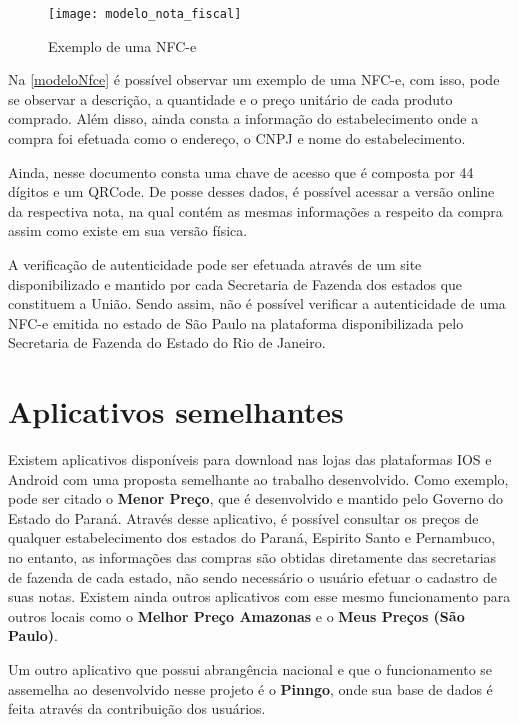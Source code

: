 \begin{figure}[h]
    \centering
    \texttt{[image: modelo\_nota\_fiscal]}
    \caption{Exemplo de uma NFC-e}
    \label{modeloNfce}
\end{figure}

Na \autoref{modeloNfce} é possível observar um exemplo de uma NFC-e, com isso, pode se observar a descrição, a quantidade e o preço unitário de cada produto comprado. Além disso, ainda consta a informação do estabelecimento onde a compra foi efetuada como o endereço, o CNPJ e nome do estabelecimento.

Ainda, nesse documento consta uma chave de acesso que é composta por 44 dígitos e um QRCode. De posse desses dados, é possível acessar a versão online da respectiva nota, na qual contém as mesmas informações a respeito da compra assim como existe em sua versão física.


A verificação de autenticidade pode ser efetuada através de um site disponibilizado e mantido por cada Secretaria de Fazenda dos estados que constituem a União. Sendo assim, não é possível verificar a autenticidade de uma NFC-e emitida no estado de São Paulo na plataforma disponibilizada pelo Secretaria de Fazenda do Estado do Rio de Janeiro.

\section{Aplicativos semelhantes}

Existem aplicativos disponíveis para download nas lojas das plataformas IOS e Android com uma proposta semelhante ao trabalho desenvolvido. Como exemplo, pode ser citado o \textbf{Menor Preço}\cite{menorPrecoApp}, que é desenvolvido e mantido pelo Governo do Estado do Paraná. Através desse aplicativo, é possível consultar os preços de qualquer estabelecimento dos estados do Paraná, Espirito Santo e Pernambuco, no entanto, as informações das compras são obtidas diretamente das secretarias de fazenda de cada estado, não sendo necessário o usuário efetuar o cadastro de suas notas. Existem ainda outros aplicativos com esse mesmo funcionamento para outros locais como o \textbf{Melhor Preço Amazonas}\cite{melhorPrecoAmazonasApp} e o \textbf{Meus Preços (São Paulo)}\cite{meusPrecosApp}.

Um outro aplicativo que possui abrangência nacional e que o funcionamento se assemelha ao desenvolvido nesse projeto é o \textbf{Pinngo}\cite{pinngoApp}, onde sua base de dados é feita através da contribuição dos usuários.